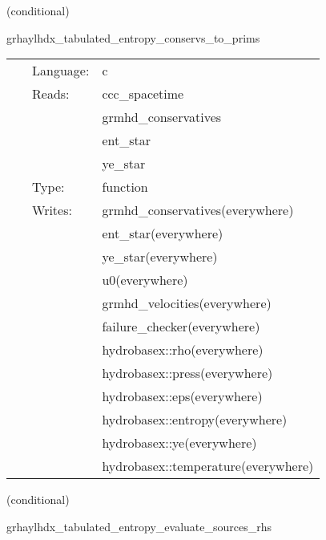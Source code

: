 \vspace{5mm}

   (conditional) 

\hspace{5mm} grhaylhdx\_tabulated\_entropy\_conservs\_to\_prims 

\hspace{5mm}{\it entropy+tabulated version of grhaylhdx\_conservs\_to\_prims } 


\hspace{5mm}

 \begin{tabular*}{160mm}{cll} 
~ & Language:  & c \\ 
~ & Reads:  & ccc\_spacetime \\ 
~& ~ &grmhd\_conservatives\\ 
~& ~ &ent\_star\\ 
~& ~ &ye\_star\\ 
~ & Type:  & function \\ 
~ & Writes:  & grmhd\_conservatives(everywhere) \\ 
~& ~ &ent\_star(everywhere)\\ 
~& ~ &ye\_star(everywhere)\\ 
~& ~ &u0(everywhere)\\ 
~& ~ &grmhd\_velocities(everywhere)\\ 
~& ~ &failure\_checker(everywhere)\\ 
~& ~ &hydrobasex::rho(everywhere)\\ 
~& ~ &hydrobasex::press(everywhere)\\ 
~& ~ &hydrobasex::eps(everywhere)\\ 
~& ~ &hydrobasex::entropy(everywhere)\\ 
~& ~ &hydrobasex::ye(everywhere)\\ 
~& ~ &hydrobasex::temperature(everywhere)\\ 
\end{tabular*} 


\vspace{5mm}

   (conditional) 

\hspace{5mm} grhaylhdx\_tabulated\_entropy\_evaluate\_sources\_rhs 

\hspace{5mm}{\it entropy+tabulated version of grhaylhdx\_evaluate\_sources\_rhs } 


